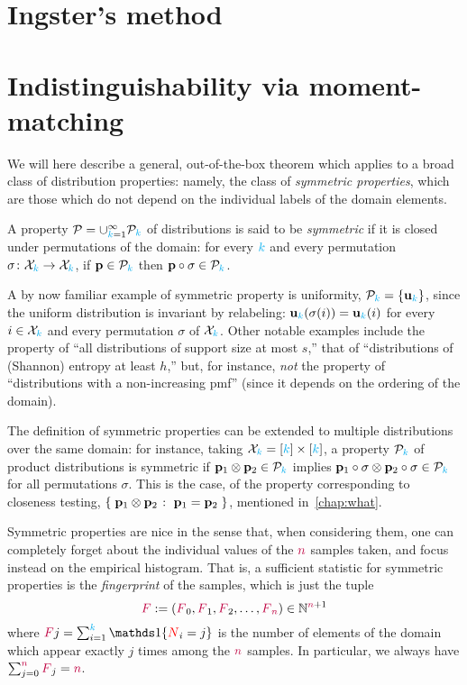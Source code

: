 
\section{Ingster's method}
\section{Indistinguishability via moment-matching}

We will here describe a general, out-of-the-box theorem which applies to a broad class of distribution properties: namely, the class of \emph{symmetric properties}, which are those which do not depend on the individual labels of the domain elements.
\begin{definition}
	A property $\mathcal{P}=\cup_{{\textcolor{cyan}{k}}=1}^\infty \mathcal{P}_{\textcolor{cyan}{k}}$ of distributions is said to be \emph{symmetric} if it is closed under permutations of the domain: for every ${\textcolor{cyan}{k}}$ and every permutation $\sigma\colon\mathcal{X}_{\textcolor{cyan}{k}}\to \mathcal{X}_{\textcolor{cyan}{k}}$, if $\mathbf{p}\in\mathcal{P}_{\textcolor{cyan}{k}}$ then $\mathbf{p}\circ\sigma\in\mathcal{P}_{\textcolor{cyan}{k}}$.
\end{definition}
A by now familiar example of symmetric property is uniformity, $\mathcal{P}_{\textcolor{cyan}{k}} =\{\mathbf{u}_{ {\textcolor{cyan}{k}} } \}$, since the uniform distribution is invariant by relabeling: $\mathbf{u}_{ {\textcolor{cyan}{k}} } (\sigma(i))=\mathbf{u}_{ {\textcolor{cyan}{k}} } (i)$ for every $i\in\mathcal{X}_{\textcolor{cyan}{k}}$ and every permutation $\sigma$ of $\mathcal{X}_{\textcolor{cyan}{k}}$. Other notable examples include the property of ``all distributions of support size at most $s$,'' that of ``distributions of (Shannon) entropy at least $h$,'' but, for instance, \emph{not} the property of ``distributions with a non-increasing pmf'' (since it depends on the ordering of the domain).

The definition of symmetric properties can be extended to multiple distributions over the same domain: for instance, taking $\mathcal{X}_{\textcolor{cyan}{k}}=[{\textcolor{cyan}{k}}]\times[{\textcolor{cyan}{k}}]$, a property $\mathcal{P}_{\textcolor{cyan}{k}}$ of product distributions is symmetric if $\mathbf{p}_1\otimes \mathbf{p}_2\in \mathcal{P}_{\textcolor{cyan}{k}}$ implies $\mathbf{p}_1\circ\sigma\otimes \mathbf{p}_2\circ\sigma\in \mathcal{P}_{\textcolor{cyan}{k}}$ for all permutations $\sigma$. This is the case, \eg of the property corresponding to {closeness testing}, $\setOfSuchThat{\p_1\otimes\p_2}{\p_1=\p_2}$, mentioned in~\cref{chap:what}.

Symmetric properties are nice in the sense that, when considering them, one can completely forget about the individual values of the ${\textcolor{purple}{n}}$ samples taken, and focus instead on the empirical histogram. That is, a sufficient statistic for symmetric properties is the \emph{fingerprint} of the samples, which is just the tuple
\[
	\textcolor{purple}{F}:= (\textcolor{purple}{F}_{0},\textcolor{purple}{F}_{1},\textcolor{purple}{F}_{2},\dots,\textcolor{purple}{F}_{{\textcolor{purple}{n}}}) \in \mathbb{N}^{{\textcolor{purple}{n}}+1}
\]
where $\freq{j} = \sum_{i=1}^\ab \indic{\occur_{i}=j}$ is the number of elements of the domain which appear exactly $j$ times among the ${\textcolor{purple}{n}}$ samples. In particular, we always have $\sum_{j=0}^{\textcolor{purple}{n}} \textcolor{purple}{F}_j = {\textcolor{purple}{n}}$.\medskip

